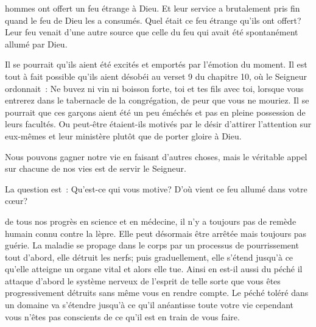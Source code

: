 
 hommes ont offert un feu étrange à Dieu.
 Et leur service a brutalement pris fin quand le feu de Dieu les a consumés.
 Quel était ce feu étrange qu'ils ont offert?
 Leur feu venait d'une autre source que celle du feu
 qui avait été spontanément allumé par Dieu.

Il se pourrait qu'ils aient été excités et emportés par l'émotion du moment.
 Il est tout à fait possible qu'ils aient désobéi au verset 9 du chapitre 10,
 où le Seigneur ordonnait~:
 \og Ne buvez ni vin ni boisson forte, toi et tes fils avec toi,
 lorsque vous entrerez dans le tabernacle de la congrégation,
 de peur que vous ne mouriez. \fg{}
 Il se pourrait que ces garçons aient été un peu éméchés
 et pas en pleine possession de leurs facultés.
 Ou peut-être étaient-ils motivés par le désir d'attirer
 l'attention sur eux-mêmes et leur ministère plutôt que de porter gloire à Dieu.


Nous pouvons gagner notre vie en faisant d'autres choses,
 mais le véritable appel sur chacune de nos vies est de servir le Seigneur.

La question est~: Qu'est-ce qui vous motive?
 D'où vient ce feu allumé dans votre cœur? 

\dvrule






 de tous nos progrès en science et en médecine,
 il n'y a toujours pas de remède humain connu contre la lèpre.
 Elle peut désormais être arrêtée mais toujours pas guérie.
 La maladie se propage dans le corps par un processus de pourrissement
 \ocadr{}tout d'abord, elle détruit les nerfs;
 puis graduellement, elle s'étend jusqu'à ce qu'elle atteigne
 un organe vital et alors elle tue.
 Ainsi en est-il aussi du péché \ocadr{}il attaque d'abord le système nerveux
 de l'esprit de telle sorte que vous êtes progressivement détruits
 sans même vous en rendre compte.
 Le péché toléré dans un domaine va s'étendre jusqu'à ce qu'il anéantisse
 toute votre vie \ocadr{}cependant vous n'êtes pas conscients
 de ce qu'il est en train de vous faire. 

